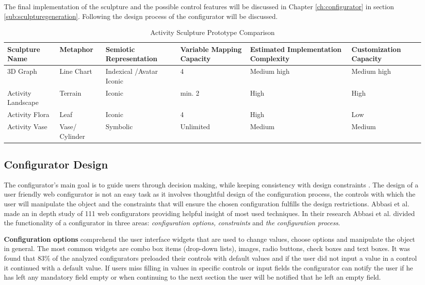 \documentclass[../medieninformatik-arbeit.tex]{subfiles}
\begin{document}
The final implementation of the sculpture and the possible control features will be discussed in Chapter \ref{ch:configurator} in section \ref{sub:sculpturegeneration}. Following the design process of the configurator will be discussed.   

\begin{table}[h]
\centering
\begin{tabular}{*{6}{|p{2.1cm}}|}
 \hline
 Sculpture Name & Metaphor & Semiotic Representation & Variable Mapping Capacity & Estimated Implementation Complexity & Customization Capacity \\
 \hline
 3D Graph & Line Chart & Indexical 	/Avatar Iconic & 4 & Medium high & Medium high\\
 \hline
 Activity Landscape & Terrain & Iconic & min. 2 & High & High\\
 \hline
 Activity Flora & Leaf & Iconic & 4 & High & Low\\
 \hline
 Activity Vase & Vase/	Cylinder & Symbolic & Unlimited & Medium & Medium\\
 \hline
\end{tabular}
\caption{Activity Sculpture Prototype Comparison}
\label{tab:comparison}
\end{table}

\subsection{Configurator Design}
The configurator's main goal is to guide users through decision making, while keeping consistency with design constraints \cite{abbasi2012s}. The design of a user friendly web configurator is not an easy task as it involves thoughtful design of the configuration process, the controls with which the user will manipulate the object and the constraints that will ensure the chosen configuration fulfills the design restrictions. Abbasi et al. made an in depth study of 111 web configurators \cite{abbasi2012s} providing helpful insight of most used techniques. In their research Abbasi et al. divided the functionality of a configurator in three areas: \textit{configuration options, constraints} and \textit{the configuration process}. 

\textbf{Configuration options} comprehend the user interface widgets that are used to change values, choose options and manipulate the object in general. The most common widgets are combo box items (drop-down lists), images, radio buttons, check boxes and text boxes. It was found that 83\% of the analyzed configurators preloaded their controls with default values and if the user did not input a value in a control it continued with a default value. If users miss filling in values in specific controls or input fields the configurator can notify the user if he has left any mandatory field empty or when continuing to the next section the user will be notified that he left an empty field.
\end{document}

